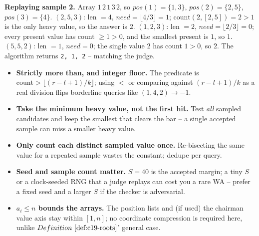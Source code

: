 \noindent\textbf{Replaying sample 2.} Array \(1\,2\,1\,3\,2\), so
\(pos(1)=\{1,3\}\), \(pos(2)=\{2,5\}\), \(pos(3)=\{4\}\).
\((2,5,3)\): len \(=4\), \(\mathit{need}=\lfloor4/3\rfloor=1\); \(\mathrm{count}(2,[2,5])=2>1\)
is the only heavy value, so the answer is \(2\). \((1,2,3)\): len \(=2\),
\(\mathit{need}=\lfloor2/3\rfloor=0\); every present value has count \(\ge1>0\), and the
smallest present is \(1\), so \(1\). \((5,5,2)\): len \(=1\), \(\mathit{need}=0\); the single
value \(2\) has count \(1>0\), so \(2\). The algorithm returns \texttt{2, 1, 2} -- matching the
judge.


\begin{hardeningbox}
\begin{itemize}[nosep,leftmargin=1.4em]
  \item \textbf{Strictly more than, and integer floor.} The predicate is
        \(\mathrm{count}>\lfloor(r-l+1)/k\rfloor\); using \(<\) or comparing against
        \((r-l+1)/k\) as a real division flips borderline queries like \((1,4,2)\to-1\).
  \item \textbf{Take the minimum heavy value, not the first hit.} Test \emph{all} sampled
        candidates and keep the smallest that clears the bar -- a single accepted sample can
        miss a smaller heavy value.
  \item \textbf{Only count each distinct sampled value once.} Re-bisecting the same value for a
        repeated sample wastes the constant; dedupe per query.
  \item \textbf{Seed and sample count matter.} \(S=40\) is the accepted margin; a tiny \(S\) or a
        clock-seeded RNG that a judge replays can cost you a rare WA -- prefer a fixed seed and
        a larger \(S\) if the checker is adversarial.
  \item \textbf{\(a_i\le n\) bounds the arrays.} The position lists and (if used) the chairman
        value axis stay within \([1,n]\); no coordinate compression is required here, unlike
        \(\defref{c19-roots}\)' general case.
\end{itemize}
\end{hardeningbox}

